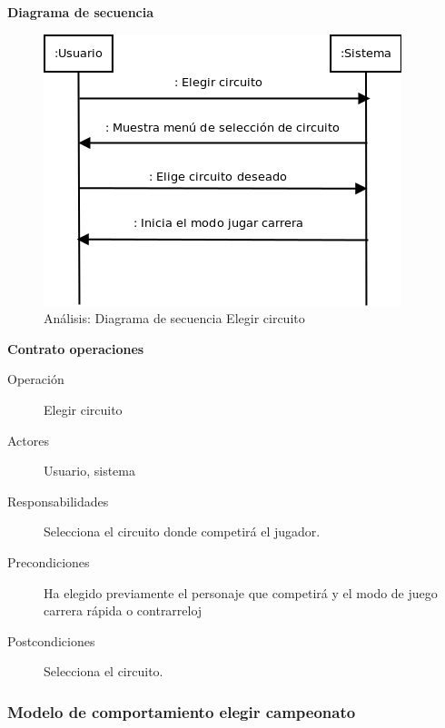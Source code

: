 \textbf{Diagrama de secuencia}
\begin{figure}[H]
  \label{dia_elegir_circuito}
  \begin{center}
    \includegraphics[scale=0.5]{imagenes/dia_elegir_circuito.png}
  \end{center}
  \caption{Análisis: Diagrama de secuencia Elegir circuito }
\end{figure}

\textbf{Contrato operaciones}

\begin{description}
    \item[Operación] Elegir circuito
    \item[Actores] Usuario, sistema
    \item[Responsabilidades] Selecciona el circuito donde competirá el jugador.
    \item[Precondiciones] Ha elegido previamente el personaje que competirá y el modo de juego carrera rápida o contrarreloj
    \item[Postcondiciones] Selecciona el circuito.
\end{description}

\subsubsection{Modelo de comportamiento elegir campeonato}

